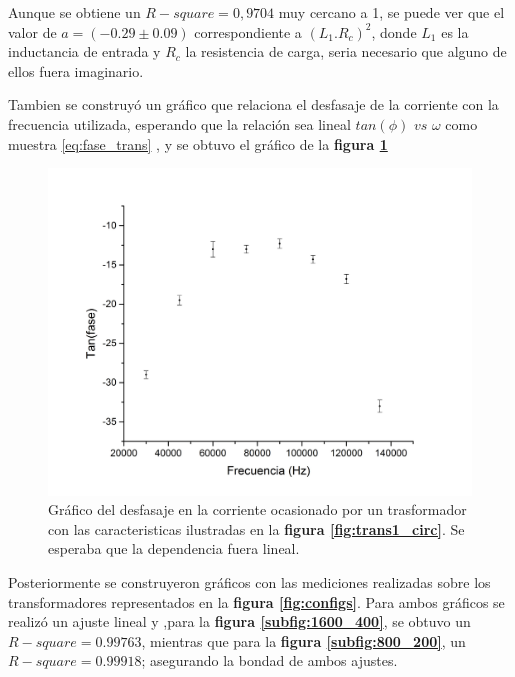\documentclass[11pt,a4paper]{article}
\begin{document}
Aunque se obtiene un $R-square = 0,9704$ muy cercano a 1, se puede ver que el valor de $a= (-0.29 \pm 0.09)$ correspondiente a $(L_{1}.R_{c})^2$, donde $L_{1}$ es la inductancia de entrada y $R_{c}$ la resistencia de carga, seria necesario que alguno de ellos fuera imaginario.

Tambien se construyó un gráfico que relaciona el desfasaje de la corriente con la frecuencia utilizada, esperando que la relación sea lineal $tan(\phi)$ $vs$ $\omega$ como muestra \eqref{eq:fase_trans} , y se obtuvo el gráfico de la \textbf{figura \ref{fig:Tr1-Des}}

\begin{figure}[H]
	\centering
	\includegraphics[scale=0.35]{Desfasaje_vs_frecuencia}
	\caption{Gráfico del desfasaje en la corriente ocasionado por un trasformador con las caracteristicas ilustradas en la \textbf{figura \ref{fig:trans1_circ}}. Se esperaba que la dependencia fuera lineal.}
	\label{fig:Tr1-Des}
\end{figure}

Posteriormente se construyeron gráficos con las mediciones realizadas sobre los transformadores representados en la \textbf{figura \ref{fig:configs}}.
Para ambos gráficos se realizó un ajuste lineal y ,para la \textbf{figura \ref{subfig:1600_400}}, se obtuvo un $R-square = 0.99763$, mientras que para la \textbf{figura \ref{subfig:800_200}}, un $R-square = 0.99918$; asegurando la bondad de ambos ajustes.
\end{document}
